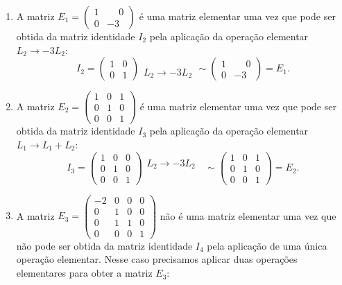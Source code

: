 \begin{exemplos}
    \begin{enumerate}
        \item A matriz $E_1 = \begin{pmatrix}1 & \phantom{-}0\\0 & -3\end{pmatrix}$ é uma matriz elementar uma vez que pode ser obtida da matriz identidade $I_2$ pela aplicação da operação elementar $L_2 \to -3L_2$:
        \[
            I_2 = \begin{pmatrix}
                1 & 0\\
                0 & 1
            \end{pmatrix}
            \begin{array}{l}
                \phantom{x}\\L_2 \to -3L_2
            \end{array}\sim
            \begin{pmatrix}
                1 & \phantom{-}0\\
                0 & -3
            \end{pmatrix} = E_1.
        \]
        \item A matriz $E_2 = \begin{pmatrix}1 & 0 & 1\\0 & 1 & 0\\0 & 0 & 1\end{pmatrix}$ é uma matriz elementar uma vez que pode ser obtida da matriz identidade $I_3$ pela aplicação da operação elementar $L_1 \to L_1 + L_2$:
        \[
            I_3 = \begin{pmatrix}
                1 & 0 & 0\\
                0 & 1 & 0\\
                0 & 0 & 1
            \end{pmatrix}
            \begin{array}{l}
                L_2 \to -3L_2\phantom{x}\\\phantom{x}
            \end{array}\sim
            \begin{pmatrix}
                1 & 0 & 1\\
                0 & 1 & 0\\
                0 & 0 & 1
            \end{pmatrix} = E_2.
        \]
        \item A matriz $E_3 = \begin{pmatrix}-2 & 0 & 0 & 0\\0 & 1 & 0 & 0\\0 & 1 & 1 & 0\\0 & 0 & 0 & 1\end{pmatrix}$ não é uma matriz elementar uma vez que não pode ser obtida da matriz identidade $I_4$ pela aplicação de uma única operação elementar. Nesse caso precisamos aplicar duas operações elementares para obter a matriz $E_3$:

\end{enumerate}
\end{exemplos}
